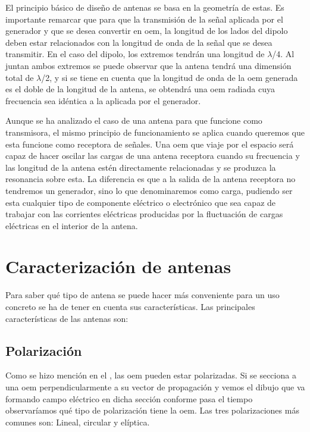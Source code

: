 \par El principio básico de diseño de antenas se basa en la geometría de estas. Es importante remarcar que para que la transmisión de la señal aplicada por el generador y que se desea convertir en \gls{oem}, la longitud de los lados del dipolo deben estar relacionados con la longitud de onda de la señal que se desea transmitir. En el caso del dipolo, los extremos tendrán una longitud de $\lambda$/4. Al juntan ambos extremos se puede observar que la antena tendrá una dimensión total de $\lambda$/2, y si se tiene en cuenta que la longitud de onda de la \gls{oem} generada es el doble de la longitud de la antena, se obtendrá una \gls{oem} radiada cuya frecuencia sea idéntica a la aplicada por el generador.
\\
\par Aunque se ha analizado el caso de una antena para que funcione como transmisora, el mismo principio de funcionamiento se aplica cuando queremos que esta funcione como receptora de señales. Una \gls{oem} que viaje por el espacio será capaz de hacer oscilar las cargas de una antena receptora cuando su frecuencia y las longitud de la antena estén directamente relacionadas y se produzca la resonancia sobre esta. La diferencia es que a la salida de la antena receptora no tendremos un generador, sino lo que denominaremos como carga, pudiendo ser esta cualquier tipo de componente eléctrico o electrónico que sea capaz de trabajar con las corrientes eléctricas producidas por la fluctuación de cargas eléctricas en el interior de la antena.

\section{Caracterización de antenas}
\par Para saber qué tipo de antena se puede hacer más conveniente para un uso concreto se ha de tener en cuenta sus características. Las principales características de las antenas son:

\subsection{Polarización}
\par Como se hizo mención en el , las \gls{oem} pueden estar polarizadas. Si se secciona a una \gls{oem} perpendicularmente a su vector de propagación y vemos el dibujo que va formando campo eléctrico en dicha sección conforme pasa el tiempo observaríamos qué tipo de polarización tiene la \gls{oem}. Las tres polarizaciones más comunes son: Lineal, circular y elíptica.

